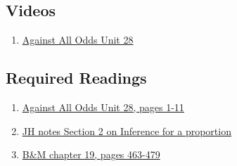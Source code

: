 \documentclass[letterpaper,9pt,twocolumn,twoside,printwatermark=false]{pinp}
\providecommand{\tightlist}{%
  \setlength{\itemsep}{0pt}\setlength{\parskip}{0pt}}
\begin{document}
\subsection{Videos}\label{videos-1}

\begin{enumerate}
\def\labelenumi{\arabic{enumi}.}
\tightlist
\item
  \href{https://www.learner.org/courses/againstallodds/unitpages/unit28.html}{Against
  All Odds Unit 28}
\end{enumerate}

\subsection{Required Readings}\label{required-readings-1}

\begin{enumerate}
\item \href{https://www.learner.org/courses/againstallodds/pdfs/AgainstAllOdds_StudentGuide_Unit28.pdf#page=1}{Against All Odds Unit 28, pages 1-11}
\item \href{https://www.dropbox.com/s/g1ui3xg8nup1p6b/proportion-model-inference-plan-2018.pdf?dl=0}{JH notes Section 2 on Inference for a proportion}
\item \href{https://www.dropbox.com/s/2h86m5qb70ntmcg/Ch19InferenceAboutPopulationProportion.pdf?dl=0}{B\&M chapter 19, pages 463-479}
\end{enumerate}





\end{document}
